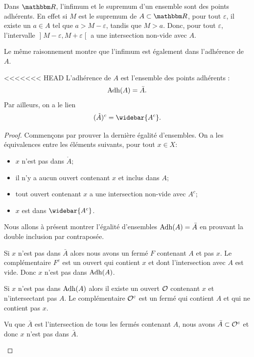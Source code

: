 \begin{example}
	Dans $\eR$, l'infimum et le supremum d'un ensemble sont des points adhérents. En effet si $M$ est le supremum de $A\subset\eR$, pour tout $\varepsilon$, il existe un $a\in A$ tel que $a>M-\varepsilon$, tandis que $M>a$. Donc, pour tout $\varepsilon$, l'intervalle \( \mathopen ] M - \varepsilon, M + \varepsilon \mathclose[ \) a une intersection non-vide avec $A$.

	Le même raisonnement montre que l'infimum est également dans l'adhérence de $A$.
\end{example}

\begin{lemma}       \label{LEMooILNCooOFZaTe}
<<<<<<< HEAD
    L'adhérence de \( A\) est l'ensemble des points adhérents :
    \begin{equation}
        \operatorname{Adh}(A)=\bar A.
    \end{equation}
    Par ailleurs, on a le lien
    \begin{equation} \label{PropCompleIntBar}
      (\mathring A)^c = \widebar{A^c}.
    \end{equation}
\end{lemma}

\begin{proof}
    Commençons par prouver la dernière égalité d'ensembles. On a les équivalences entre les éléments suivants, pour tout $x \in X$:
    \begin{itemize}
    \item $x$ n'est pas dans $\mathring A$;
    \item il n'y a aucun ouvert contenant $x$ et inclus dans $A$;
    \item tout ouvert contenant $x$ a une intersection non-vide avec $A^c$;
    \item $x$ est dans $\widebar{A^c}$.
    \end{itemize}
    Nous allons à présent montrer l'égalité d'ensembles \( \operatorname{Adh}(A)=\bar A \) en prouvant la double inclusion par contraposée.
    \begin{subproof}
        \item[Si \( x\in \bar A\) alors \( x\in\Adh(A)\)]
            Si \( x\) n'est pas dans \( \bar A\) alors nous avons un fermé \( F\) contenant \( A\) et pas \( x\). Le complémentaire \( F^c\) est un ouvert qui contient \( x\) et dont l'intersection avec \( A\) est vide. Donc \( x\) n'est pas dans \( \operatorname{Adh}(A)\).

        \item[Si \( x\in\bar A\) alors \( x\in \Adh(A)\)]

            Si \( x\) n'est pas dans \( \operatorname{Adh}(A)\) alors il existe un ouvert \( \mathcal{O}\) contenant \( x\) et n'intersectant pas \( A\). Le complémentaire \( \mathcal{O}^c\) est un fermé qui contient \( A\) et qui ne contient pas \( x\).

            Vu que \( \bar A\) est l'intersection de tous les fermés contenant \( A\), nous avons \( \bar A\subset\mathcal{O}^c\) et donc \( x\) n'est pas dans \( \bar A\).
    \end{subproof}
\end{proof}


